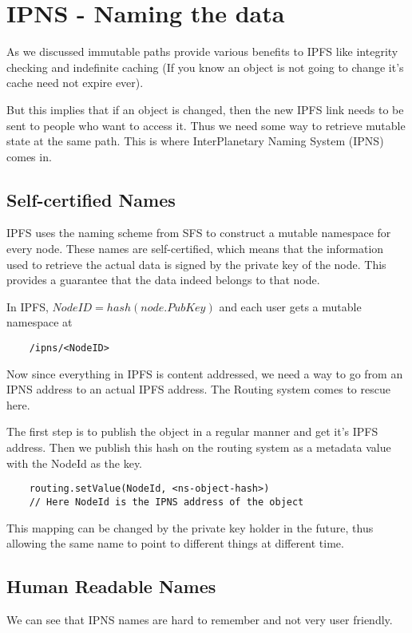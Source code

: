 \section{IPNS - Naming the data}

As we discussed immutable paths provide various benefits to IPFS like integrity checking and indefinite caching (If you know an object is not going to change it's cache need not expire ever).

But this implies that if an object is changed, then the new IPFS link needs to be sent to people who want to access it. Thus we need some way to retrieve mutable state at the same path. This is where InterPlanetary Naming System (IPNS) comes in.

\subsection{Self-certified Names}
IPFS uses the naming scheme from SFS \cite{Mazieres:2000:SFS:934196} to construct a mutable namespace for every node. These names are self-certified, which means that the information used to retrieve the actual data is signed by the private key of the node. This provides a guarantee that the data indeed belongs to that node.

In IPFS, $NodeID = hash(node.PubKey)$ and each user gets a mutable namespace at
\begin{verbatim}
    /ipns/<NodeID>
\end{verbatim}

Now since everything in IPFS is content addressed, we need a way to go from an IPNS address to an actual IPFS address. The Routing system comes to rescue here.

The first step is to publish the object in a regular manner and get it's IPFS address. Then we publish this hash on the routing system as a metadata value with the NodeId as the key.

\begin{verbatim}
    routing.setValue(NodeId, <ns-object-hash>)
    // Here NodeId is the IPNS address of the object
\end{verbatim}

This mapping can be changed by the private key holder in the future, thus allowing the same name to point to different things at different time.

\subsection{Human Readable Names}
We can see that IPNS names are hard to remember and not very user friendly.

